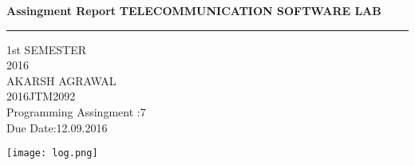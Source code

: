 \documentclass[12pt]{article}
\begin{document}
\begin{center}
{
{\huge{\textbf{Assingment Report}}}  %
\textbf{TELECOMMUNICATION SOFTWARE LAB} \\
\textcolor{black}{\rule{\textwidth}{2pt}}
1st SEMESTER\\
2016\\
\bigskip  %
\bigskip
\bigskip
\bigskip
\bigskip
\bigskip
\bigskip
AKARSH AGRAWAL\\
2016JTM2092\\

\bigskip
\bigskip
\large{
Programming Assingment :7\\
Due Date:12.09.2016\\
}
}
\vspace{9mm} %
\texttt{[image: log.png]} %
\end{center}




\newpage
\begin{center}
\renewcommand*\contentsname{Table of Contents} %
\tableofcontents
\end{center}
\end{document}
